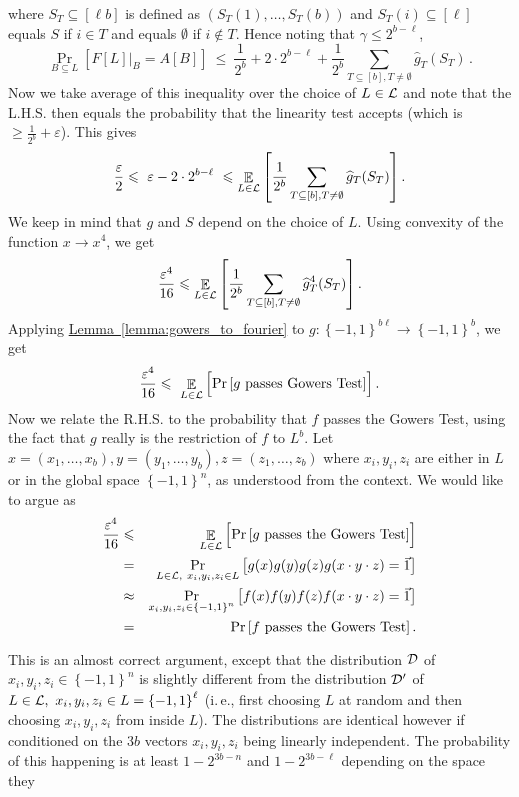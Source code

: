 \documentclass[11pt]{article}
\numberwithin{equation}{section}
\theoremstyle{definition}
\theoremstyle{plain}
\newcommand{\ie}{i.\,e.}
\newcommand{\expref}[2]{\hyperref[#2]{#1~\ref{#2}}}
\newcommand\set[1]{{\left\{ #1 \right\}}}
\newcommand\Prob[2]{{\Pr_{#1}\left[ {#2} \right]}}
\newcommand\Expect[2]{{\mathop{\mathbb{E}}_{#1}\left[ {#2} \right]}}
\newcommand\cube[1]{ { \set{-1,1}^{#1} } }
\newcommand\eps{\varepsilon}
\renewcommand\geq{\geqslant}
\renewcommand\leq{\leqslant}
\begin{document}
where $S_T \subseteq [\ell b]$ is defined as $(S_T(1), \ldots, S_T(b))$  and  $S_T(i)
\subseteq [\ell]$ equals $S$ if $i \in T$ and equals $\emptyset$ if $i \not\in T$. Hence noting
that $\gamma \leq 2^{b-\ell}$,
 $$ \Prob{B \subseteq L}{F[L]|_B = A[B]}  ~\leq   ~ \frac{1}{2^b} + 2 \cdot 2^{b-\ell}  + \frac{1}{2^b} \sum_{T \subseteq [b], T \neq  \emptyset }  \widehat{g}_T (S_T)\,. $$%
Now we take average of this inequality over the choice of $L \in {\cal L}$ and note that the L.H.S. then equals the probability that the linearity test accepts (which is
~$\geq \frac{1}{2^b}+\eps$). This gives
 $$ \frac{\eps}{2} \leq   ~\eps - 2 \cdot 2^{b-\ell}  ~\leq  \Expect{L \in {\cal L}} { \frac{1}{2^b} \sum_{T \subseteq [b], T \neq  \emptyset }  \widehat{g}_T (S_T) }\,. $$%
We keep in mind that $g$ and $S$ depend on the choice of $L$. Using convexity of the function $x \to x^4$, we get
 $$ \frac{\eps^4}{16} \leq    \Expect{L \in {\cal L}} {  \frac{1}{2^b} \sum_{T \subseteq [b], T \neq  \emptyset }  \widehat{g}^4_T (S_T) }\,.$$%
Applying \expref{Lemma}{lemma:gowers_to_fourier} to $g: \cube{b\ell} \to \cube{b}$, we get
 $$ \frac{\eps^4}{16} \leq     ~\Expect{L \in {\cal L}}{ \Prob{}{g ~\mbox{passes Gowers Test}  }}\,. $$%
Now we relate the R.H.S. to the probability that $f$ passes the Gowers Test, using the fact that $g$ really is the restriction of
$f$ to $L^b$. Let $x = (x_1,\ldots,x_b), y = (y_1,\ldots,y_b), z= (z_1,\ldots,z_b)$ where $x_i, y_i, z_i$ are either in $L$ or in the global space $\cube{n}$,
as understood from the context. We would like to argue as
\begin{eqnarray*}
  \frac{\eps^4}{16} & \leq &    \Expect{L \in {\cal L}}{ \Prob{}{g ~\mbox{passes
the Gowers Test}  }}\\
 & = &   \Prob{L \in {\cal L}, ~x_i,y_i,z_i \in L}{g(x)g(y)g(z)g(x\cdot y\cdot z) = \vec{1} }\\
 & \approx & \Prob{x_i,y_i,z_i \in \cube{n}}{f(x)f(y)f(z)f(x\cdot y\cdot z) = \vec{1}} \\
 & = & \Prob{}{f ~\mbox{passes the Gowers Test}}\,.%
 \end{eqnarray*}
This is an almost correct argument, except that the distribution ${\cal D}$ of $x_i, y_i, z_i \in \cube{n}$ is slightly different from
the distribution ${\cal D}'$ of $L \in {\cal L}, ~x_i, y_i, z_i \in L = \cube{\ell}$  (\ie, first choosing $L$ at random and then
choosing $x_i, y_i, z_i$ from inside $L$). The distributions are identical however if conditioned on the $3b$ vectors $x_i, y_i, z_i$
being linearly independent. The probability of this happening is at least $1-2^{3b-n}$ and $1-2^{3b-\ell}$ depending on the space they
\end{document}
